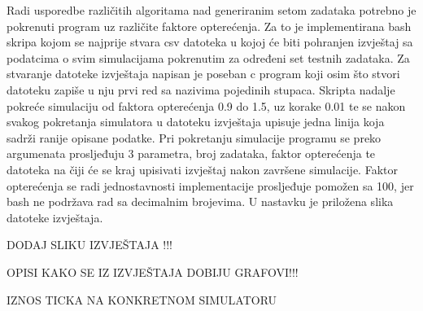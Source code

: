 \documentclass[../zavrsni.tex]{subfiles}
\begin{document}
Radi usporedbe različitih algoritama nad generiranim setom zadataka potrebno je pokrenuti program uz različite faktore opterećenja. 
Za to je implementirana bash skripa kojom se najprije stvara csv datoteka u kojoj će biti pohranjen izvještaj sa podatcima o 
svim simulacijama pokrenutim za određeni set testnih zadataka. Za stvaranje datoteke izvještaja napisan je poseban c program koji osim što
stvori datoteku zapiše u nju prvi red sa nazivima pojedinih stupaca.
Skripta nadalje pokreće simulaciju od faktora opterećenja 0.9 do 1.5, uz korake 0.01 te se nakon svakog pokretanja simulatora u 
datoteku izvještaja upisuje jedna linija koja sadrži ranije opisane podatke.
Pri pokretanju simulacije programu se preko argumenata prosljeđuju 3 parametra, broj zadataka, 
faktor opterećenja te datoteka na čiji će se kraj upisivati izvještaj nakon završene simulacije.
Faktor opterećenja se radi jednostavnosti implementacije prosljeđuje pomožen sa 100, jer bash ne podržava rad sa decimalnim brojevima.
U nastavku je priložena slika datoteke izvještaja.

DODAJ SLIKU IZVJEŠTAJA !!!

OPISI KAKO SE IZ IZVJEŠTAJA DOBIJU GRAFOVI!!!

IZNOS TICKA NA KONKRETNOM SIMULATORU
\end{document}
